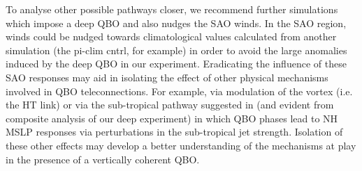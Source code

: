 To analyse other possible pathways closer, we recommend further simulations which impose a deep QBO and also nudges the SAO winds. In the SAO region, winds could be nudged towards climatological values calculated from another simulation (the pi-clim cntrl, for example) in order to avoid the large anomalies induced by the deep QBO in our experiment. Eradicating the influence of these SAO responses may aid in isolating the effect of other physical mechanisms involved in QBO teleconnections. For example, via modulation of the vortex (i.e. the HT link) or via the sub-tropical pathway suggested in \cite{graySurface2018b} (and evident from composite analysis of our deep experiment) in which QBO phases lead to NH MSLP responses via perturbations in the sub-tropical jet strength. Isolation of these other effects may develop a better understanding of the mechanisms at play in the presence of a vertically coherent QBO.  
















